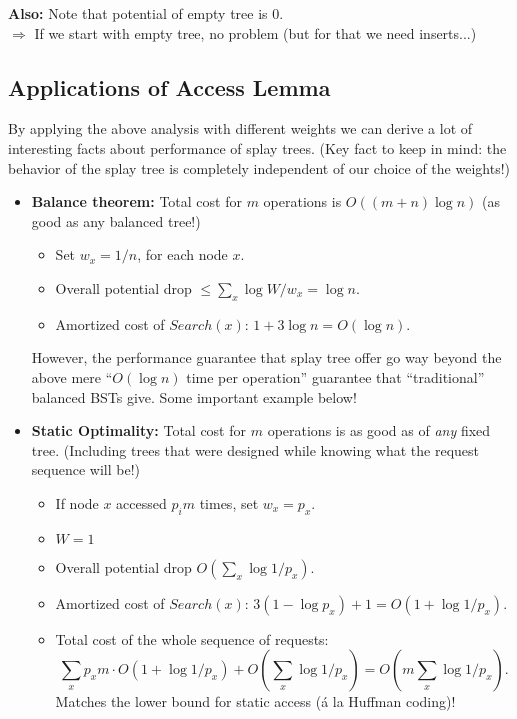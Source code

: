 \documentclass{article}
\begin{document}
{\bf Also:} Note that potential of empty tree is $0$.\\
$\Rightarrow$ If we start with empty tree, no problem (but for that we need inserts...)

\subsection{Applications of Access Lemma}

By applying the above analysis with different weights we can derive a lot of interesting facts about performance of splay trees. (Key fact to keep in mind: the behavior of the splay tree is completely independent of our choice of the weights!)

\begin{itemize}
\item {\bf Balance theorem:} Total cost for $m$ operations is $O((m+n)\log n)$ (as good as any
balanced tree!)
\begin{itemize}
\item Set $w_x=1/n$, for each node $x$.
\item Overall potential drop $\leq \sum_x \log W/w_x = \log n$.
\item Amortized cost of $Search(x)$: $1+3\log n=O(\log n)$.
\end{itemize}

However, the performance guarantee that splay tree offer go way beyond the above mere ``$O(\log n)$ time per operation'' guarantee that ``traditional'' balanced BSTs give. Some important example below!

\item {\bf Static Optimality:}  Total cost for $m$ operations is as good as of {\em any} fixed tree. (Including trees that were designed while knowing what the request sequence will be!)
\begin{itemize}
\item If node $x$ accessed $p_i m$ times, set $w_x=p_x$.
\item $W=1$
\item Overall potential drop $O( \sum_x \log 1/p_x)$.
\item Amortized cost of $Search(x)$: $3(1-\log p_x)+1 = O(1+\log
  1/p_x)$.
\item Total cost of the whole sequence of requests:
\[
\sum_x p_x m \cdot O\left(1+\log 1/p_x\right) + O\left( \sum_x \log 1/p_x\right)=O\left(m \sum_x \log 1/p_x\right).
\]
Matches the lower bound for static access (\'a la Huffman coding)!
\end{itemize}



\end{itemize}
\end{document}
